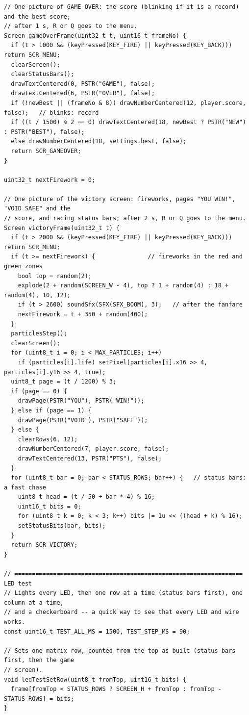 \documentclass[11pt,a4paper]{article}
\begin{document}
\begin{lstlisting}[language=Arduino]
// One picture of GAME OVER: the score (blinking if it is a record) and the best score;
// after 1 s, R or Q goes to the menu.
Screen gameOverFrame(uint32_t t, uint16_t frameNo) {
  if (t > 1000 && (keyPressed(KEY_FIRE) || keyPressed(KEY_BACK))) return SCR_MENU;
  clearScreen();
  clearStatusBars();
  drawTextCentered(0, PSTR("GAME"), false);
  drawTextCentered(6, PSTR("OVER"), false);
  if (!newBest || (frameNo & 8)) drawNumberCentered(12, player.score, false);   // blinks: record
  if ((t / 1500) % 2 == 0) drawTextCentered(18, newBest ? PSTR("NEW") : PSTR("BEST"), false);
  else drawNumberCentered(18, settings.best, false);
  return SCR_GAMEOVER;
}

uint32_t nextFirework = 0;

// One picture of the victory screen: fireworks, pages "YOU WIN!", "VOID SAFE" and the
// score, and racing status bars; after 2 s, R or Q goes to the menu.
Screen victoryFrame(uint32_t t) {
  if (t > 2000 && (keyPressed(KEY_FIRE) || keyPressed(KEY_BACK))) return SCR_MENU;
  if (t >= nextFirework) {               // fireworks in the red and green zones
    bool top = random(2);
    explode(2 + random(SCREEN_W - 4), top ? 1 + random(4) : 18 + random(4), 10, 12);
    if (t > 2600) soundSfx(SFX(SFX_BOOM), 3);   // after the fanfare
    nextFirework = t + 350 + random(400);
  }
  particlesStep();
  clearScreen();
  for (uint8_t i = 0; i < MAX_PARTICLES; i++)
    if (particles[i].life) setPixel(particles[i].x16 >> 4, particles[i].y16 >> 4, true);
  uint8_t page = (t / 1200) % 3;
  if (page == 0) {
    drawPage(PSTR("YOU"), PSTR("WIN!"));
  } else if (page == 1) {
    drawPage(PSTR("VOID"), PSTR("SAFE"));
  } else {
    clearRows(6, 12);
    drawNumberCentered(7, player.score, false);
    drawTextCentered(13, PSTR("PTS"), false);
  }
  for (uint8_t bar = 0; bar < STATUS_ROWS; bar++) {   // status bars: a fast chase
    uint8_t head = (t / 50 + bar * 4) % 16;
    uint16_t bits = 0;
    for (uint8_t k = 0; k < 3; k++) bits |= 1u << ((head + k) % 16);
    setStatusBits(bar, bits);
  }
  return SCR_VICTORY;
}

// ================================================================= LED test
// Lights every LED, then one row at a time (status bars first), one column at a time,
// and a checkerboard -- a quick way to see that every LED and wire works.
const uint16_t TEST_ALL_MS = 1500, TEST_STEP_MS = 90;

// Sets one matrix row, counted from the top as built (status bars first, then the game
// screen).
void ledTestSetRow(uint8_t fromTop, uint16_t bits) {
  frame[fromTop < STATUS_ROWS ? SCREEN_H + fromTop : fromTop - STATUS_ROWS] = bits;
}


\end{lstlisting}
\end{document}
